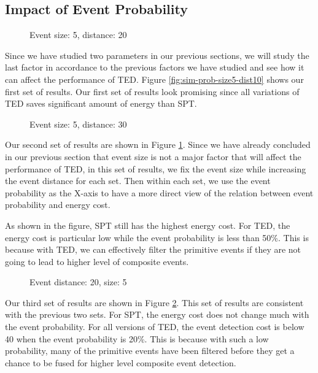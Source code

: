 \subsection{Impact of Event Probability}

\begin{figure}
\centering
{}
\caption{Event size: 5, distance: 20}
\label{fig:sim-prob-size5-dist20}
\end{figure}

Since we have studied two parameters in our previous sections, we will study the last factor in accordance to the previous factors we have studied and see how it can affect the performance of TED. Figure \ref{fig:sim-prob-size5-dist10} shows our first set of results. Our first set of results look promising since all variations of TED saves significant amount of energy than SPT.

\begin{figure}
\centering
{}
\caption{Event size: 5, distance: 30}
\label{fig:sim-prob-size5-dist30}
\end{figure}

Our second set of results are shown in Figure \ref{fig:sim-prob-size5-dist20}. Since we have already concluded in our previous section that event size is not a major factor that will affect the performance of TED, in this set of results, we fix the event size while increasing the event distance for each set. Then within each set, we use the event probability as the X-axis to have a more direct view of the relation between event probability and energy cost.

As shown in the figure, SPT still has the highest energy cost. For TED, the energy cost is particular low while the event probability is less than 50\%. This is because with TED, we can effectively filter the primitive events if they are not going to lead to higher level of composite events.

\begin{figure}
\centering
{}
\caption{Event distance: 20, size: 5}
\label{fig:sim-prob-dist20-size5}
\end{figure}

Our third set of results are shown in Figure \ref{fig:sim-prob-size5-dist30}. This set of results are consistent with the previous two sets. For SPT, the energy cost does not change much with the event probability. For all versions of TED, the event detection cost is below 40 when the event probability is 20\%. This is because with such a low probability, many of the primitive events have been filtered before they get a chance to be fused for higher level composite event detection.


